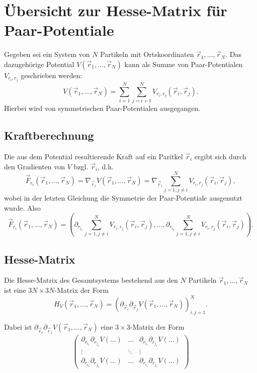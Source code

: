 \documentclass{scrartcl}
\begin{document}
\section*{Übersicht zur Hesse-Matrix für Paar-Potentiale}

Gegeben sei ein System von \(N\) Partikeln mit Ortskoordinaten \(\vec{r}_1, \dots, \vec{r}_N\). Das dazugehörige Potential \(V(\vec{r}_1, \dots, \vec{r}_N)\) kann als Summe von Paar-Potentialen \(V_{r_i, r_j}\) geschrieben werden:
\[V(\vec{r}_1, \dots, \vec{r}_N) = \sum_{i=1}^N \sum_{j=i+1}^N V_{r_i, r_j}(\vec{r}_i, \vec{r}_j). \]
Hierbei wird von symmetrischen Paar-Potentialen ausgegangen.

\subsection*{Kraftberechnung}
\label{sec:kraftberechnung}

Die aus dem Potential resultierende Kraft auf ein Paritkel \(\vec{r}_i\) ergibt sich durch den Gradienten von \(V\) bzgl. \(\vec{r}_i\), d.h.
\[\vec{F}_{r_i} (\vec{r}_1, \dots, \vec{r}_N) = \nabla_{\vec{r}_i} V(\vec{r}_1, \dots, \vec{r}_N) = \nabla_{\vec{r}_i} \sum_{j=1, j\neq i}^N V_{r_i, r_j}(\vec{r}_i, \vec{r}_j), \]
wobei in der letzten Gleichung die Symmetrie der Paar-Potentiale ausgenutzt wurde.
Also
\[ \vec{F}_{r_i} (\vec{r}_1, \dots, \vec{r}_N) = \left( \partial_{r_{i_1}} \sum_{j=1, j\neq i}^N V_{r_i, r_j}(\vec{r}_i, \vec{r}_j), \dots, \partial_{r_{i_3}} \sum_{j=1, j\neq i}^N V_{r_i, r_j}(\vec{r}_i, \vec{r}_j) \right).\]

\subsection*{Hesse-Matrix}
\label{sec:hesse-matrix}

Die Hesse-Matrix des Gesamtsystems bestehend aus den \(N\) Partikeln \(\vec{r}_1, \dots, \vec{r}_N\) ist eine \(3N \times 3N\)-Matrix der Form
\[H_V(\vec{r}_1, \dots, \vec{r}_N) = \left( \partial_{\vec{r}_i} \partial_{\vec{r}_j} V(\vec{r}_1, \dots, \vec{r}_N) \right)_{i,j = 1}^N. \]

Dabei ist \(\partial_{\vec{r}_i} \partial_{\vec{r}_j} V(\vec{r}_1, \dots, \vec{r}_N)\) eine \(3\times 3\)-Matrix der Form
\[
\begin{pmatrix}
\partial_{r_{i_1}}\partial_{r_{j_1}} V(\dots) & \dots & \partial_{r_{i_1}}\partial_{r_{j_1}} V(\dots) \\
\vdots & \ddots & \vdots \\
\partial_{r_{i_1}}\partial_{r_{j_1}} V(\dots) & \dots & \partial_{r_{i_1}}\partial_{r_{j_1}} V(\dots)
\end{pmatrix}
\]
\end{document}
